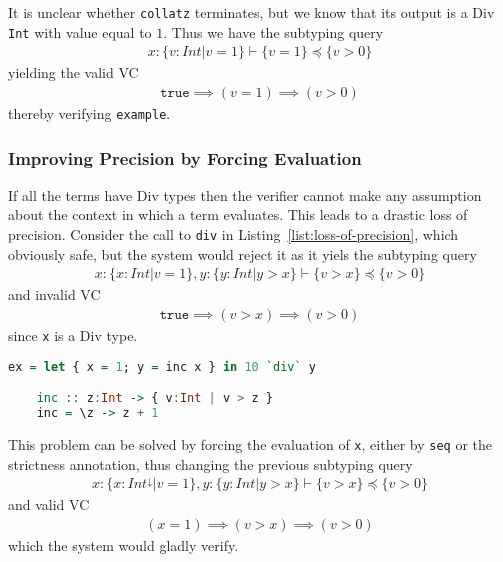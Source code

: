 \documentclass[a4paper,UKenglish]{lipics-v2016}
\begin{document}
It is unclear whether \texttt{collatz} terminates, but we know that its output
is a Div \texttt{Int} with value equal to $1$.  Thus we have the subtyping
query
\begin{align*}
    x:\{v:Int|v=1\}\vdash\{v=1\}\preceq\{v>0\}
\end{align*}
yielding the valid VC
\begin{align*}
    \mathtt{true}\implies(v=1)\implies(v>0)
\end{align*}
thereby verifying \texttt{example}.

\subsubsection{Improving Precision by Forcing Evaluation}
If all the terms have Div types then the verifier cannot make any assumption
about the context in which a term evaluates.  This leads to a drastic loss of
precision.  Consider the call to \texttt{div} in
Listing~\ref{list:loss-of-precision}, which obviously safe, but the system
would reject it as it yiels the subtyping query
\begin{align*}
    x:\{x:Int|v=1\},y:\{y:Int|y>x\}\vdash\{v>x\}\preceq\{v>0\}
\end{align*}
and invalid VC
\begin{align*}
    \mathtt{true}\implies(v>x)\implies(v>0)
\end{align*}
since \texttt{x} is a Div type.
\begin{lstlisting}[caption={Loss of Precision},float,captionpos=t,label={list:loss-of-precision},language=haskell,abovecaptionskip=-\medskipamount]
    ex = let { x = 1; y = inc x } in 10 `div` y

    inc :: z:Int -> { v:Int | v > z }
    inc = \z -> z + 1
\end{lstlisting}

This problem can be solved by forcing the evaluation of \texttt{x}, either by
\texttt{seq} or the strictness annotation, thus changing the previous subtyping
query
\begin{align*}
    x:\{x:Int^{\downarrow}|v=1\},y:\{y:Int|y>x\}\vdash\{v>x\}\preceq\{v>0\}
\end{align*}
and valid VC
\begin{align*}
    (x=1)\implies(v>x)\implies(v>0)
\end{align*}
which the system would gladly verify.
\end{document}
